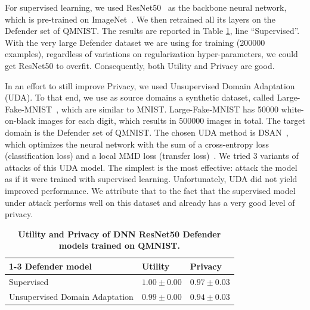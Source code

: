 \documentclass[letterpaper]{article}
\begin{document}
For supervised learning, we used ResNet50~\cite{he2016deep} as the backbone neural network, which is pre-trained on ImageNet~\cite{deng2009imagenet}. We then retrained all its layers on the Defender set of QMNIST. The results are reported in Table \ref{tab:DA}, line ``Supervised''. With the very large Defender dataset we are using for training (200000 examples), regardless of variations on regularization hyper-parameters, we could get ResNet50 to overfit. Consequently, both Utility and Privacy are good.

In an effort to still improve Privacy, we used Unsupervised Domain Adaptation (UDA). To that end, we use as source domains  a synthetic dataset, called Large-Fake-MNIST~\cite{sun2021omniprint}, which are similar to MNIST. Large-Fake-MNIST has 50000 white-on-black images for each digit, which results in 500000 images in total. The target domain is the Defender set of QMNIST. The chosen UDA method is DSAN~\cite{zhuDeepSubdomainAdaptation2021,deepdaJindong}, which optimizes the neural network with the sum of a cross-entropy loss (classification loss) and a local MMD loss (transfer loss)~\cite{zhuDeepSubdomainAdaptation2021}. We tried 3 variants of attacks of this UDA model. The simplest is the most effective: attack the model as if it were trained with supervised learning. Unfortunately, UDA did not yield improved performance. We attribute that to the fact that the supervised model under attack performs well on this dataset and already has a very good level of privacy.



\begin{table}[h]

\caption{\label{tab:DA} \footnotesize \bf Utility and Privacy of DNN ResNet50 Defender models trained on QMNIST.}
\centering
\setlength{\tabcolsep}{0.5mm}{}
\begin{tabular}{|l|l|l|}
\hline
\cline{1-3}
Defender model  & Utility & Privacy \\
\hline
Supervised & \(1.00\pm 0.00\) & \(0.97\pm 0.03\) \\
\hline
Unsupervised Domain Adaptation  & \( 0.99\pm 0.00\) & \( 0.94\pm 0.03\) \\
\hline
\end{tabular}

\end{table}

\end{document}
